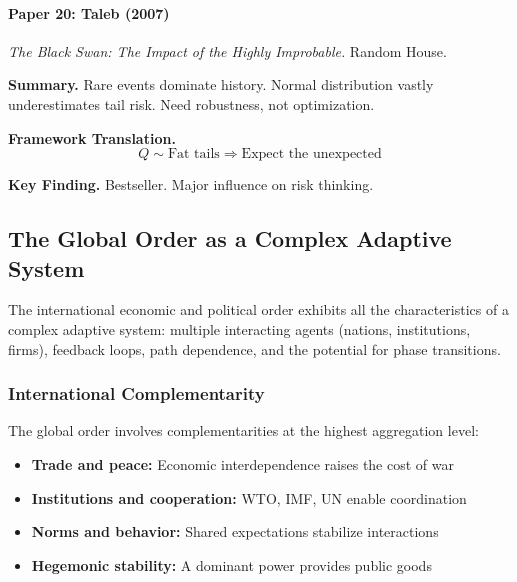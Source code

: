 \paragraph{Paper 20: Taleb (2007)}

\textit{The Black Swan: The Impact of the Highly Improbable.}
Random House.

\textbf{Summary.}
Rare events dominate history. Normal distribution vastly underestimates 
tail risk. Need robustness, not optimization.

\textbf{Framework Translation.}
\begin{equation}
Q \sim \text{Fat tails} \Rightarrow \text{Expect the unexpected}
\end{equation}

\textbf{Key Finding.}
Bestseller. Major influence on risk thinking.

\subsection{The Global Order as a Complex Adaptive System}
\label{sec:global-complex}

The international economic and political order exhibits all the characteristics
of a complex adaptive system: multiple interacting agents (nations, institutions,
firms), feedback loops, path dependence, and the potential for phase transitions.

\subsubsection{International Complementarity}

The global order involves complementarities at the highest aggregation level:
\begin{itemize}
    \item \textbf{Trade and peace:} Economic interdependence raises the cost of war
    \item \textbf{Institutions and cooperation:} WTO, IMF, UN enable coordination
    \item \textbf{Norms and behavior:} Shared expectations stabilize interactions
    \item \textbf{Hegemonic stability:} A dominant power provides public goods
\end{itemize}

